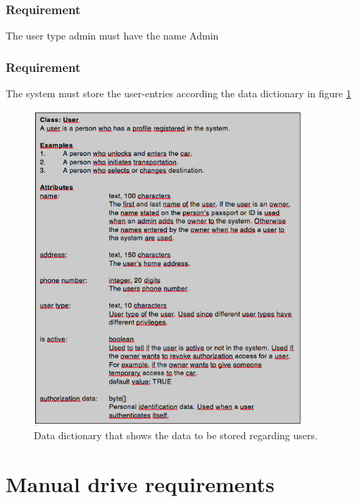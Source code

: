 \documentclass{article}
\begin{document}
{      \subsubsection{Requirement}
\hfill \break 
\- \- \-The user type admin must have the name Admin
      \subsubsection{Requirement}
\hfill \break 
\- \- \-The system must store the user-entries according the data dictionary in figure \ref{fi:dd1}
\begin{figure}[!htb]   
 \centering
 \includegraphics[width=0.9\textwidth]
    {DD1.png}
  \caption{Data dictionary that shows the data to be stored regarding users.}
  \label{fi:dd1}
\end{figure}
\bigskip
{}
\section{Manual drive requirements}
}
\end{document}
